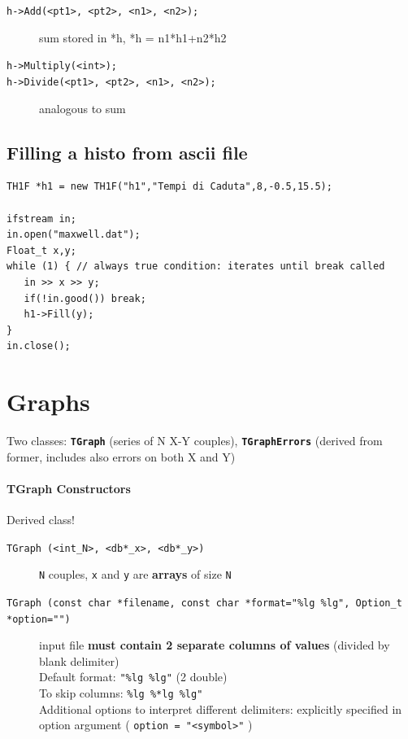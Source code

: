 \documentclass[10pt, twoside]{article}
\newcommand{\ttt}[1]{\colorbox{boxgray}{\texttt{#1}}}
\begin{document}
\begin{description}

\item[\ttt{h->Add(<pt1>, <pt2>, <n1>, <n2>);}] sum stored in *h, *h = n1*h1+n2*h2

\item[\ttt{h->Multiply(<int>);}]

\item[\ttt{h->Divide(<pt1>, <pt2>, <n1>, <n2>);}] analogous to sum

\end{description}

\subsection{Filling a histo from ascii file}
\begin{verbatim}
TH1F *h1 = new TH1F("h1","Tempi di Caduta",8,-0.5,15.5); 

ifstream in;
in.open("maxwell.dat");
Float_t x,y;
while (1) { // always true condition: iterates until break called
   in >> x >> y;
   if(!in.good()) break;
   h1->Fill(y);
}
in.close();
\end{verbatim}

\section{Graphs}
Two classes: \textbf{\ttt{TGraph}} (series of N X-Y couples), \textbf{\ttt{TGraphErrors}} (derived from former, includes also errors on both X and Y)

\paragraph{TGraph Constructors} Derived class!
\begin{description}
\item[\ttt{TGraph (<int\_N>, <db*\_x>, <db*\_y>)}] \texttt{N} couples, \ttt{x} and \ttt{y} are \textbf{arrays} of size \texttt{N}
\item[\ttt{TGraph (const char *filename, const char *format="\%lg \%lg", 
Option\_t *option="")}] input file \textbf{must contain 2 separate columns of values} (divided by blank delimiter) 
\\Default format: \ttt{"\%lg \%lg"} (2 double)\\
To skip columns: \ttt{\%lg \%*lg \%lg"}
\\Additional options to interpret different delimiters: explicitly specified in option argument ( \ttt{option = "<symbol>"} )
\end{description}
\end{document}
